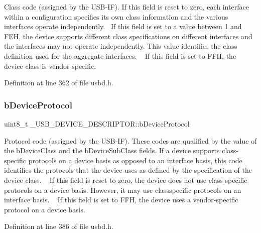 Class code (assigned by the U\+S\+B-\/\+IF). If this field is reset to zero, each interface within a configuration specifies its own class information and the various interfaces operate independently.~\newline
If this field is set to a value between 1 and F\+EH, the device supports different class specifications on different interfaces and the interfaces may not operate independently. This value identifies the class definition used for the aggregate interfaces. ~\newline
If this field is set to F\+FH, the device class is vendor-\/specific. 

Definition at line 362 of file usbd.\+h.

\mbox{\label{struct___u_s_b___d_e_v_i_c_e___d_e_s_c_r_i_p_t_o_r_a5e1d87e4f157ba11e93095f7e706a27e}} 
\subsubsection{\texorpdfstring{b\+Device\+Protocol}{bDeviceProtocol}}
{\footnotesize\ttfamily uint8\+\_\+t \+\_\+\+U\+S\+B\+\_\+\+D\+E\+V\+I\+C\+E\+\_\+\+D\+E\+S\+C\+R\+I\+P\+T\+O\+R\+::b\+Device\+Protocol}

Protocol code (assigned by the U\+S\+B-\/\+IF). These codes are qualified by the value of the b\+Device\+Class and the b\+Device\+Sub\+Class fields. If a device supports class-\/specific protocols on a device basis as opposed to an interface basis, this code identifies the protocols that the device uses as defined by the specification of the device class. ~\newline
If this field is reset to zero, the device does not use class-\/specific protocols on a device basis. However, it may use classspecific protocols on an interface basis. ~\newline
If this field is set to F\+FH, the device uses a vendor-\/specific protocol on a device basis. 

Definition at line 386 of file usbd.\+h.

